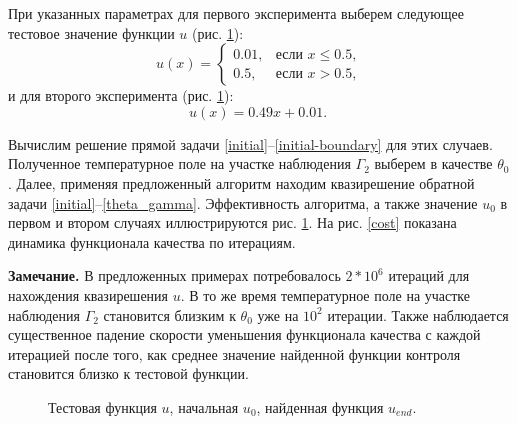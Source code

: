 \documentclass[10pt]{article}
\begin{document}
    При указанных параметрах для первого эксперимента выберем следующее тестовое значение
    функции $u$ (рис. \ref{control}):
    \begin{equation}
        u(x)=
        \begin{cases}
            0.01, & \text{если } x \le 0.5, \\
            0.5, & \text{если } x > 0.5,
        \end{cases}
    \end{equation}
    и для второго эксперимента (рис. \ref{control}):
    \begin{equation}
        \label{test_function_1}
        u(x)=0.49x+0.01. \;
    \end{equation}

    Вычислим решение прямой задачи \eqref{initial}--\eqref{initial-boundary} для этих случаев. Полученное температурное поле на участке наблюдения $\Gamma_2$ выберем в качестве $\theta_0$. Далее, применяя предложенный алгоритм находим квазирешение обратной задачи \eqref{initial}--\eqref{theta_gamma}. Эффективность алгоритма, а также значение $u_0$ в первом и втором случаях иллюстрируются рис. \ref{control}. На рис. \ref{cost} показана динамика функционала качества по итерациям.

        {\bf Замечание.} В предложенных примерах потребовалось $2*10^6$ итераций для нахождения квазирешения $u$. В то же время температурное поле на участке наблюдения $\Gamma_2$ становится близким к $\theta_0$ уже на $10^2$ итерации. Также наблюдается существенное падение скорости уменьшения функционала качества с каждой итерацией после того, как среднее значение найденной функции контроля становится близко к тестовой функции.
    \begin{figure}[H]
        \centering
        \caption{Тестовая функция $u$, начальная $u_0$, найденная функция $u_{end}.$}
        \label{control}
    \end{figure}
\end{document}
